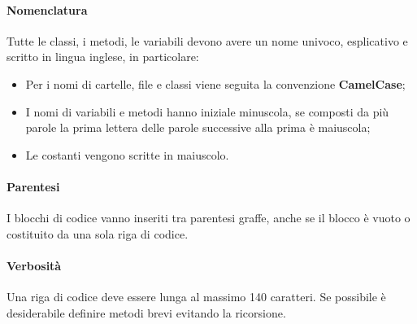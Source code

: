 \paragraph*{Nomenclatura}
Tutte le classi, i metodi, le variabili devono avere un nome univoco, esplicativo e scritto in lingua inglese, in particolare:
\begin{itemize}
	\item Per i nomi di cartelle, file e classi viene seguita la convenzione \textbf{CamelCase};
	\item I nomi di variabili e metodi hanno iniziale minuscola, se composti da più parole la prima lettera delle parole successive alla prima è maiuscola;
	\item Le costanti vengono scritte in maiuscolo.
\end{itemize}
\paragraph*{Parentesi}
I blocchi di codice vanno inseriti tra parentesi graffe, anche se il blocco è vuoto o costituito da una sola riga di codice.
\paragraph*{Verbosità}
Una riga di codice deve essere lunga al massimo 140 caratteri. Se possibile è desiderabile definire metodi brevi evitando la ricorsione.

